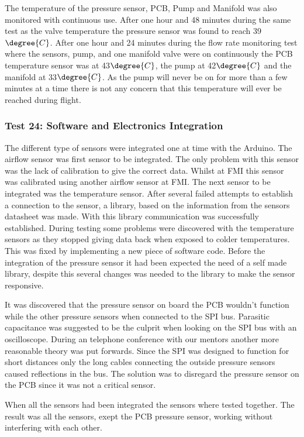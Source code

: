 \documentclass[a4paper,12pt,oneside]{article}
\begin{document}
\begin{appendices}
The temperature of the pressure sensor, PCB, Pump and Manifold was also monitored with continuous use. After one hour and 48 minutes during the same test as the valve temperature the pressure sensor was found to reach 39$\degree{C}$. After one hour and 24 minutes during the flow rate monitoring test where the sensors, pump, and one manifold valve were on continuously the PCB temperature sensor was at 43$\degree{C}$, the pump at 42$\degree{C}$ and the manifold at 33$\degree{C}$. As the pump will never be on for more than a few minutes at a time there is not any concern that this temperature will ever be reached during flight.

\subsubsection{Test 24: Software and Electronics Integration}
The different type of sensors were integrated one at time with the Arduino. The airflow sensor was first sensor to be integrated. The only problem with this sensor was the lack of calibration to give the correct data. Whilst at FMI this sensor was calibrated using another airflow sensor at FMI. The next sensor to be integrated was the temperature sensor. After several failed attempts to establish a connection to the sensor, a library, based on the information from the sensors datasheet was made. With this library communication was successfully established. During testing some problems were discovered with the temperature sensors as they stopped giving data back when exposed to colder temperatures. This was fixed by implementing a new piece of software code. Before the integration of the pressure sensor it had been expected the need of a self made library, despite this several changes was needed to the library to make the sensor responsive. \par
It was discovered that the pressure sensor on board the PCB wouldn't function while the other pressure sensors when connected to the SPI bus. Parasitic capacitance was suggested to be the culprit when looking on the SPI bus with an oscilloscope. During an telephone conference with our mentors another more reasonable theory was put forwards. Since the SPI was designed to function for short distances only the long cables connecting the outside pressure sensors caused reflections in the bus. The solution was to disregard the pressure sensor on the PCB since it was not a critical sensor.\par
When all the sensors had been integrated the sensors where tested together. The result was all the sensors, exept the PCB pressure sensor, working without interfering with each other.


\end{appendices}
\end{document}
